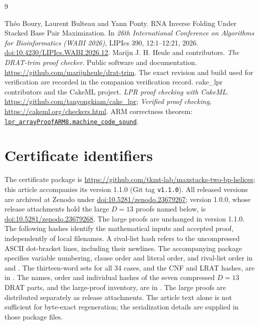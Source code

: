 \documentclass[11pt,a4paper]{article}
\theoremstyle{definition}
\begin{document}
\begin{thebibliography}{9}
\raggedright
{}
Th\'eo Boury, Laurent Bulteau and Yann Ponty.
RNA Inverse Folding Under Stacked Base Pair Maximization.
In \emph{26th International Conference on Algorithms for Bioinformatics
(WABI 2026)}, LIPIcs 390, 12:1--12:21, 2026.
\href{https://doi.org/10.4230/LIPIcs.WABI.2026.12}{doi:10.4230/LIPIcs.WABI.2026.12}.
Marijn J. H. Heule and contributors.
\emph{The DRAT-trim proof checker}. Public software and documentation.
\url{https://github.com/marijnheule/drat-trim}.
The exact revision and build used for verification are recorded in the
companion verification record.
cake\_lpr contributors and the CakeML project.
\emph{LPR proof checking with CakeML}.
\url{https://github.com/tanyongkiam/cake_lpr};
\emph{Verified proof checking}, \url{https://cakeml.org/checkers.html}.
ARM correctness theorem:
\href{https://github.com/CakeML/cakeml/blob/fb377b4bb704497c921cde68ccc8da3b4f0e9132/examples/lpr_checker/array/compilation/proofsARM8/lpr_arrayProofARM8Script.sml}{\texttt{lpr\_arrayProofARM8.machine\_code\_sound}}.
\end{thebibliography}

\appendix
\section{Certificate identifiers}\label{app:cert}
The certificate package is
\url{https://github.com/tkmt-lab/maxstacks-two-bp-helices}; this
article accompanies its version 1.1.0 (Git tag \texttt{v1.1.0}).
All released versions are archived at Zenodo under
\href{https://doi.org/10.5281/zenodo.23679267}{doi:10.5281/zenodo.23679267};
version 1.0.0, whose release attachments hold the large $D=13$ proofs
named below, is
\href{https://doi.org/10.5281/zenodo.23679268}{doi:10.5281/zenodo.23679268}.
The large proofs are unchanged in version 1.1.0.
The following hashes identify the mathematical inputs and accepted
proof, independently of local filenames. A rival-list hash refers to
the uncompressed ASCII dot-bracket lines, including their newlines.
The accompanying package specifies variable numbering, clause order and
literal order, and rival-list order in  and
. The thirteen-word sets for all 34 cases,
and the CNF and LRAT hashes, are in .
The names, order and individual hashes of the seven compressed $D=13$
DRAT parts, and the large-proof inventory, are in
. The large proofs are distributed separately
as release attachments. The article text alone is not sufficient for
byte-exact regeneration; the serialization details are supplied in those
package files.
\end{document}
